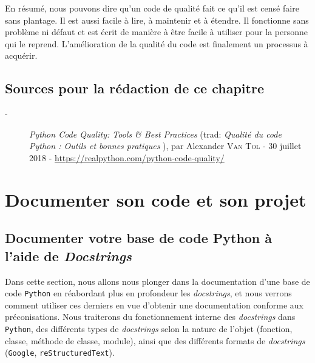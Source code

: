 \documentclass[a4paper,11pt]{book}
\begin{document}
En résumé, nous pouvons dire qu'un code de qualité fait ce qu'il est censé faire sans plantage. Il est aussi facile à lire, à maintenir et à étendre. Il fonctionne sans problème ni défaut et est écrit de manière à être facile à utiliser pour la personne qui le reprend. L'amélioration de la qualité du code est finalement un processus à acquérir.
\medskip

\section*{Sources pour la rédaction de ce chapitre}
\begin{description}
	\item[-] \textit{Python Code Quality: Tools \& Best Practices} (trad: \og \textit{Qualité du code Python : Outils et bonnes pratiques} \fg{}), par Alexander \textsc{Van Tol} - 30 juillet 2018 - \url{https://realpython.com/python-code-quality/}
\end{description}
\medskip

\chapter{Documenter son code et son projet}\label{documentercodeprojet}
\section{Documenter votre base de code Python à l'aide de \textit{Docstrings}}
Dans cette section, nous allons nous plonger dans la documentation d'une base de code \texttt{Python} en réabordant plus en profondeur les \textit{docstrings}, et nous verrons comment utiliser ces derniers en vue d'obtenir une documentation conforme aux préconisations. Nous traiterons du fonctionnement interne des \textit{docstrings} dans \texttt{Python}, des différents types de \textit{docstrings} selon la nature de l'objet (fonction, classe, méthode de classe, module), ainsi que des différents formats de \textit{docstrings} (\texttt{Google}, \texttt{reStructuredText}).
\medskip
\end{document}

